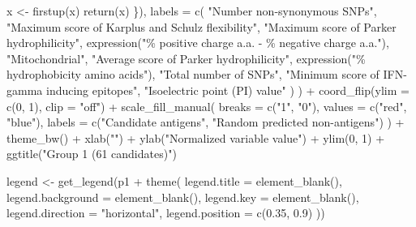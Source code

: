 \documentclass[
  11pt,
  oneside]{book}
\newenvironment{Shaded}{\begin{snugshade}}{\end{snugshade}}
\newcommand{\AttributeTok}[1]{\textcolor[rgb]{0.77,0.63,0.00}{#1}}
\newcommand{\DecValTok}[1]{\textcolor[rgb]{0.00,0.00,0.81}{#1}}
\newcommand{\FloatTok}[1]{\textcolor[rgb]{0.00,0.00,0.81}{#1}}
\newcommand{\FunctionTok}[1]{\textcolor[rgb]{0.00,0.00,0.00}{#1}}
\newcommand{\NormalTok}[1]{#1}
\newcommand{\OtherTok}[1]{\textcolor[rgb]{0.56,0.35,0.01}{#1}}
\newcommand{\SpecialCharTok}[1]{\textcolor[rgb]{0.00,0.00,0.00}{#1}}
\newcommand{\StringTok}[1]{\textcolor[rgb]{0.31,0.60,0.02}{#1}}
\begin{document}
\begin{Shaded}
\begin{Highlighting}[]
\NormalTok{      x }\OtherTok{\textless{}{-}} \FunctionTok{firstup}\NormalTok{(x)}
      \FunctionTok{return}\NormalTok{(x)}
\NormalTok{    \}),}
    \AttributeTok{labels =} \FunctionTok{c}\NormalTok{(}
      \StringTok{"Number non{-}synonymous SNPs"}\NormalTok{,}
      \StringTok{"Maximum score of Karplus and Schulz flexibility"}\NormalTok{,}
      \StringTok{"Maximum score of Parker hydrophilicity"}\NormalTok{,}
      \FunctionTok{expression}\NormalTok{(}\StringTok{"\% positive charge a.a. {-} \% negative charge a.a."}\NormalTok{),}
      \StringTok{"Mitochondrial"}\NormalTok{,}
      \StringTok{"Average score of Parker hydrophilicity"}\NormalTok{,}
      \FunctionTok{expression}\NormalTok{(}\StringTok{"\% hydrophobicity amino acids"}\NormalTok{),}
      \StringTok{"Total number of SNPs"}\NormalTok{,}
      \StringTok{"Minimum score of IFN{-}gamma inducing epitopes"}\NormalTok{,}
      \StringTok{"Isoelectric point (PI) value"}
\NormalTok{    )}
\NormalTok{  ) }\SpecialCharTok{+}
  \FunctionTok{coord\_flip}\NormalTok{(}\AttributeTok{ylim =} \FunctionTok{c}\NormalTok{(}\DecValTok{0}\NormalTok{, }\DecValTok{1}\NormalTok{), }\AttributeTok{clip =} \StringTok{"off"}\NormalTok{) }\SpecialCharTok{+}
  \FunctionTok{scale\_fill\_manual}\NormalTok{(}
    \AttributeTok{breaks =} \FunctionTok{c}\NormalTok{(}\StringTok{"1"}\NormalTok{, }\StringTok{"0"}\NormalTok{), }\AttributeTok{values =} \FunctionTok{c}\NormalTok{(}\StringTok{"red"}\NormalTok{, }\StringTok{"blue"}\NormalTok{),}
    \AttributeTok{labels =} \FunctionTok{c}\NormalTok{(}\StringTok{"Candidate antigens"}\NormalTok{, }\StringTok{"Random predicted non{-}antigens"}\NormalTok{)}
\NormalTok{  ) }\SpecialCharTok{+}
  \FunctionTok{theme\_bw}\NormalTok{() }\SpecialCharTok{+}
  \FunctionTok{xlab}\NormalTok{(}\StringTok{""}\NormalTok{) }\SpecialCharTok{+}
  \FunctionTok{ylab}\NormalTok{(}\StringTok{"Normalized variable value"}\NormalTok{) }\SpecialCharTok{+}
  \FunctionTok{ylim}\NormalTok{(}\DecValTok{0}\NormalTok{, }\DecValTok{1}\NormalTok{) }\SpecialCharTok{+}
  \FunctionTok{ggtitle}\NormalTok{(}\StringTok{"Group 1 (61 candidates)"}\NormalTok{)}

\NormalTok{legend }\OtherTok{\textless{}{-}} \FunctionTok{get\_legend}\NormalTok{(p1 }\SpecialCharTok{+} \FunctionTok{theme}\NormalTok{(}
  \AttributeTok{legend.title =} \FunctionTok{element\_blank}\NormalTok{(),}
  \AttributeTok{legend.background =} \FunctionTok{element\_blank}\NormalTok{(),}
  \AttributeTok{legend.key =} \FunctionTok{element\_blank}\NormalTok{(),}
  \AttributeTok{legend.direction =} \StringTok{"horizontal"}\NormalTok{,}
  \AttributeTok{legend.position =} \FunctionTok{c}\NormalTok{(}\FloatTok{0.35}\NormalTok{, }\FloatTok{0.9}\NormalTok{)}
\NormalTok{))}


\end{Highlighting}
\end{Shaded}
\end{document}
